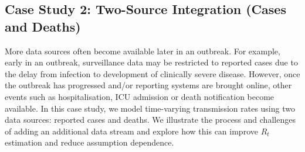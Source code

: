 \documentclass{article}
\begin{document}
\subsection{Case Study 2: Two-Source Integration (Cases and Deaths)}

More data sources often become available later in an outbreak. For example, early in an outbreak, surveillance data may be restricted to reported cases due to the delay from infection to development of clinically severe disease. However, once the outbreak has progressed and/or reporting systems are brought online, other events such as hospitalisation, \ac{ICU} admission or death notification become available. In this case study, we model time-varying transmission rates using two data sources: reported cases and deaths. We illustrate the process and challenges of adding an additional data stream and explore how this can improve $R_t$ estimation and reduce assumption dependence.
\end{document}
